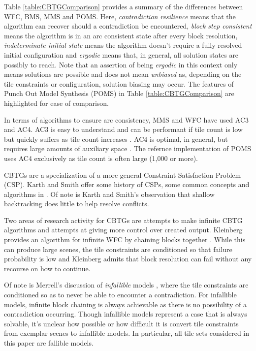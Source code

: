Table \ref{table:CBTGComparison} provides a summary of the differences between WFC, BMS, MMS and POMS.
Here, \textit{contradiction resilience} means that the algorithm can recover should a contradiction be encountered,
\textit{block step consistent} means the algorithm is in an arc consistent state after every block resolution,
\textit{indeterminate initial state} means the algorithm doesn't require a fully resolved initial configuration and
\textit{ergodic} means that, in general, all solution states are possibly to reach.
Note that an assertion of being \textit{ergodic} in this context only means solutions
are possible and does not mean \textit{unbiased} as, depending on the tile constraints or configuration,
solution biasing may occur.
The features of Punch Out Model Synthesis (POMS) in Table \ref{table:CBTGComparison} are highlighted for ease of comparison.

In terms of algorithms to ensure arc consistency, MMS and WFC have used AC3 and AC4.
AC3 is easy to understand and can be performant if tile count is low but quickly suffers as tile count increases \cite{Wallace1993WhyAI}.
AC4 is optimal, in general, but requires large amounts of auxiliary space \cite{Mohr_Henderson_1986}.
The refernce implementation of POMS uses AC4 exclusively as tile count is often large (1,000 or more).


CBTGs are a specialization of a more general Constraint Satisfaction Problem (CSP).
Karth and Smith offer some history of CSPs, some common concepts and algorithms in \cite{Karth_Smith_2017, Karth_Smith_2022}.
Of note is Karth and Smith's observation that shallow backtracking does little to help resolve conflicts.


Two areas of research activity for CBTGs are attempts to make infinite CBTG algorithms
and attempts at giving more control over created output.
Kleinberg provides an algorithm for infinite WFC by chaining blocks together \cite{Kleinberg_2019}.
While this can produce large scenes, the tile constraints are conditioned so that failure probability is low and Kleinberg admits
that block resolution can fail without any recourse on how to continue.

Of note is Merrell's discussion of \textit{infallible} models \cite{Merrell_2009}, where the tile constraints are
conditioned so as to never be able to encounter a contradiction.
For infallible models, infinite block chaining is always achievable as there is no possibility of a contradiction occurring.
Though infallible models represent a case that is always solvable,
it's unclear how possible or how difficult it is convert tile constraints from exemplar scenes to infallible models.
In particular, all tile sets considered in this paper are fallible models.

